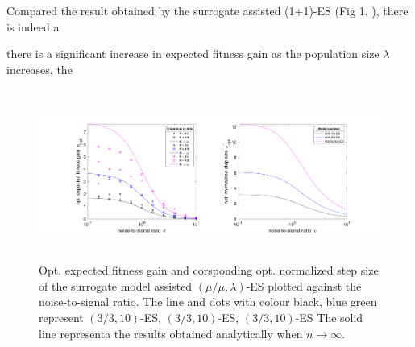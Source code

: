 
Compared the result obtained by the surrogate assisted (1+1)-ES (Fig 1. \cite{DBLP:conf/ppsn/KayhaniA18}), there is indeed a 

there is a significant increase in expected fitness gain as the population size $\lambda$ increases, the 




\begin{center}
\begin{figure}
\includegraphics[height=2.2in, width=6in]{opt_stepSize_fitGain_v1}
\caption{Opt. expected fitness gain and corsponding opt. normalized step size of the surrogate model assisted $(\mu/\mu,\lambda)$-ES plotted against the noise-to-signal ratio. The line and dots with colour black, blue green represent $(3/3,10)$-ES, $(3/3,10)$-ES, $(3/3,10)$-ES The solid line representa the results obtained analytically when $n\rightarrow \infty$. }
\end{figure}
\end{center}

